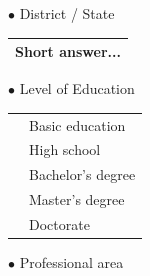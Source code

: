 $\bullet$ District / State

\vspace{0.6cm}
\begin{center}
    \noindent\begin{tabularx}{0.9\textwidth}{ |>{\raggedright\arraybackslash}X| }
        \hline
        \hspace{0.2cm}Short answer... \\
        \hline
    \end{tabularx}
\end{center}
\vspace{0.6cm}

$\bullet$ Level of Education

\vspace{0.6cm}
\begin{center}
    \noindent\begin{tabularx}{0.8\textwidth}{ >{\centering\arraybackslash}X >{\raggedright\arraybackslash}X }
        {\huge $\circ$} & Basic education \\[0.2cm]
        {\huge $\circ$} & High school \\[0.2cm]
        {\huge $\circ$} & Bachelor's degree \\[0.2cm]
        {\huge $\circ$} & Master's degree \\[0.2cm]
        {\huge $\circ$} & Doctorate
    \end{tabularx}
\end{center}
\vspace{0.6cm}

$\bullet$ Professional area

